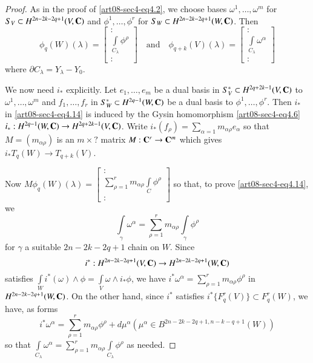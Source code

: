 \begin{proof}
As in the proof of \eqref{art08-sec4-eq4.2}, we choose bases $\omega^{1},\ldots,\omega^{m}$ for $S_{V}\subset H^{2n-2k-2q+1}(V,\mathbf{C})$ and $\phi^{1},\ldots,\phi^{r}$ for $S_{W}\subset H^{2n-2k-2q+1}(W,\mathbf{C})$. Then
$$
\phi_{q}(W)(\lambda)=
\begin{bmatrix}
:\\
\int\limits_{C_{\lambda}}\phi^{\rho}\\
:
\end{bmatrix}
\text{~~ and~~ } \phi_{q+k}(V)(\lambda)=
\begin{bmatrix}
:\\
\int\limits_{C_{\lambda}}\omega^{\alpha}\\
:
\end{bmatrix}
$$
where $\partial C_{\lambda}=Y_{\lambda}-Y_{0}$.


We now need $i_{*}$ explicitly. Let $e_{1},\ldots,e_{m}$ be a dual basis in $S^{*}_{V}\subset H^{2q+2k-1}(V,\mathbf{C})$ to $\omega^{1},\ldots,\omega^{m}$ and $f_{1},\ldots,f_{r}$ in $S^{*}_{W}\subset H^{2q-1}(W,\mathbf{C})$ be a dual basis to $\phi^{1},\ldots,\phi^{r}$. Then $i_{*}$ in \eqref{art08-sec4-eq4.14} is induced by the Gysin homomorphism \eqref{art08-sec4-eq4.6} $i_{*}:H^{2q-1}(W,\mathbf{C})\to H^{2q+2k-1}(V,\mathbf{C})$. Write $i_{*}(f_{\rho})=\sum\limits_{\alpha=1}m_{\alpha\rho}e_{\alpha}$ so that $M=(m_{\alpha\rho})$ is an $m\times ?$ matrix $M:\mathbf{C}^{r}\to \mathbf{C}^{m}$ which gives $i_{*}T_{q}(W)\to T_{q+k}(V)$.

Now $M\phi_{q}(W)(\lambda)=\left[\begin{smallmatrix}:\\ \sum\limits^{r}_{\rho=1}m_{\alpha\rho}\int\limits_{C}\phi^{\rho}\\ :\end{smallmatrix}\right]$ so that, to prove \eqref{art08-sec4-eq4.14}, we 
\begin{equation}
\int\limits_{\gamma}\omega^{\alpha}=\sum\limits^{r}_{\rho=1}m_{\alpha\rho}\int\limits_{\gamma}\phi^{\rho}\label{art08-sec4-eq4.15}
\end{equation}
for $\gamma$ a suitable $2n-2k-2q+1$ chain on $W$. Since
$$
i^{*}:H^{2n-2k-2q+1}(V,\mathbf{C})\to H^{2n-2k-2q+1}(W,\mathbf{C})
$$
satisfies $\int\limits_{W}i^{*}(\omega)\wedge \phi=\int\limits_{V}\omega \wedge i_{*}\phi$, we have $i^{*}\omega^{\alpha}=\sum\limits^{r}_{\rho=1}m_{\alpha\rho}\phi^{\rho}$ in $H^{2n-2k-2q+1}(W,\mathbf{C})$. On the other hand, since $i^{*}$ satisfies $i^{*}\{F^{r}_{q}(V)\}\subset F^{r}_{q}(W)$, we have, as forms 
$$
i^{*}\omega^{\alpha}=\sum\limits^{r}_{\rho=1}m_{\alpha\rho}\phi^{\rho}+d\mu^{\alpha}(\mu^{\alpha}\in B^{2n-2k-2q+1, n-k-q+1}(W))
$$ 
so that $\int\limits_{C_{\lambda}}\omega^{\alpha}=\sum\limits^{r}_{\rho=1}m_{\alpha\rho}\int\limits_{C_{\lambda}}\phi^{\rho}$ as needed.
\end{proof}

